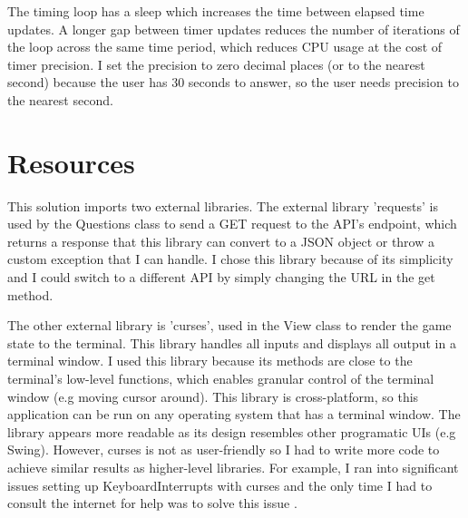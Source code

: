 \documentclass[12pt]{article}
\begin{document}
The timing loop has a sleep which increases the time between elapsed time updates. A longer gap between timer updates reduces the number of iterations of the loop across the same time period, which reduces CPU usage at the cost of timer precision. I set the precision to zero decimal places (or to the nearest second) because the user has 30 seconds to answer, so the user needs precision to the nearest second.

\section{Resources}


This solution imports two external libraries. The external library 'requests' is used by the Questions class to send a GET request to the API's endpoint, which returns a response that this library can convert to a JSON object or throw a custom exception that I can handle. I chose this library because of its simplicity and I could switch to a different API by simply changing the URL in the get method.

\vspace{\baselineskip}

The other external library is 'curses', used in the View class to render the game state to the terminal. This library handles all inputs and displays all output in a terminal window. I used this library because its methods are close to the terminal's low-level functions, which enables granular control of the terminal window (e.g moving cursor around). This library is cross-platform, so this application can be run on any operating system that has a terminal window. The library appears more readable as its design resembles other programatic UIs (e.g Swing). However, curses is not as user-friendly so I had to write more code to achieve similar results as higher-level libraries.  For example, I ran into significant issues setting up KeyboardInterrupts with curses and the only time I had to consult the internet for help was to solve this issue \cite{web:2}.
\end{document}
